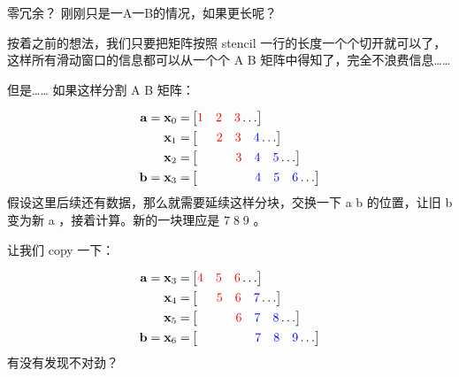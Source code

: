\documentclass[aspectratio=169,10pt]{beamer}
\begin{document}
\begin{frame}[fragile]{零冗余？}
刚刚只是一A一B的情况，如果更长呢？
\par
按着之前的想法，我们只要把矩阵按照 stencil 一行的长度一个个切开就可以了，这样所有滑动窗口的信息都可以从一个个 A B 矩阵中得知了，完全不浪费信息……
\par
\end{frame}

\begin{frame}[fragile]{但是……}
如果这样分割 A B 矩阵：
\par
\[
\begin{aligned}
\mathbf{a}=\mathbf{x}_0 =&
\begin{bmatrix}
{\color{red}1} & {\color{red}2} & {\color{red}3}
\dots
\end{bmatrix}
\\
\mathbf{x}_1 =&
\begin{bmatrix}
&\;\;{\color{red}2} & {\color{red}3} & {\color{blue}4} 
\dots
\end{bmatrix}
\\
\mathbf{x}_2 =&
\begin{bmatrix}
&&\;\;\;\;{\color{red}3} & {\color{blue}4} & {\color{blue}5} 
\dots
\end{bmatrix}
\\
\mathbf{b}=\mathbf{x}_3 =&
\begin{bmatrix}
&&&\;\;\;\;\;\;{\color{blue}4} & {\color{blue}5} & {\color{blue}6} 
\dots
\end{bmatrix}
\end{aligned}
\]
假设这里后续还有数据，那么就需要延续这样分块，交换一下 a b 的位置，让旧 b 变为新 a ，接着计算。新的一块理应是 $7\;8\;9$ 。
\par
让我们 copy 一下：
\par
\[
\begin{aligned}
\mathbf{a}=\mathbf{x}_3 =&
\begin{bmatrix}
{\color{red}4} & {\color{red}5} & {\color{red}6}
\dots
\end{bmatrix}
\\
\mathbf{x}_4 =&
\begin{bmatrix}
&\;\;{\color{red}5} & {\color{red}6} & {\color{blue}7} 
\dots
\end{bmatrix}
\\
\mathbf{x}_5 =&
\begin{bmatrix}
&&\;\;\;\;{\color{red}6} & {\color{blue}7} & {\color{blue}8} 
\dots
\end{bmatrix}
\\
\mathbf{b}=\mathbf{x}_6 =&
\begin{bmatrix}
&&&\;\;\;\;\;\;{\color{blue}7} & {\color{blue}8} & {\color{blue}9} 
\dots
\end{bmatrix}
\end{aligned}
\]
有没有发现不对劲？
\par
\end{frame}
\end{document}
